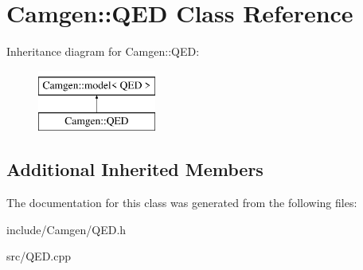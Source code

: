\hypertarget{a00451}{\section{Camgen\-:\-:Q\-E\-D Class Reference}
\label{a00451}
}
Inheritance diagram for Camgen\-:\-:Q\-E\-D\-:\begin{figure}[H]
\begin{center}
\leavevmode
\includegraphics[height=2.000000cm]{a00451}
\end{center}
\end{figure}
\subsection*{Additional Inherited Members}


The documentation for this class was generated from the following files\-:\begin{DoxyCompactItemize}
\item 
include/\-Camgen/Q\-E\-D.\-h\item 
src/Q\-E\-D.\-cpp\end{DoxyCompactItemize}
